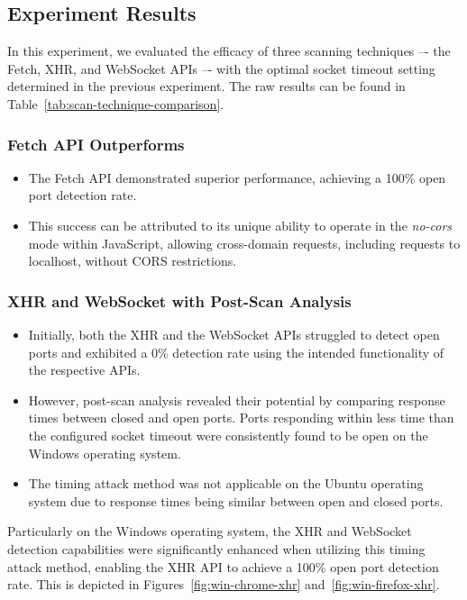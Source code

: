 \subsection{Experiment Results}

In this experiment, we evaluated the efficacy of three scanning techniques –- the Fetch, XHR, and WebSocket APIs –- with the optimal socket timeout setting determined in the previous experiment. The raw results can be found in Table~\ref{tab:scan-technique-comparison}.

\subsubsection{Fetch API Outperforms}

\begin{itemize}
    \item The Fetch API demonstrated superior performance, achieving a 100\% open port detection rate.
    \item This success can be attributed to its unique ability to operate in the \emph{no-cors} mode within JavaScript, allowing cross-domain requests, including requests to localhost, without CORS restrictions.
\end{itemize}

\subsubsection{XHR and WebSocket with Post-Scan Analysis}

\begin{itemize}
    \item Initially, both the XHR and the WebSocket APIs struggled to detect open ports and exhibited a 0\% detection rate using the intended functionality of the respective APIs.
    \item However, post-scan analysis revealed their potential by comparing response times between closed and open ports. Ports responding within less time than the configured socket timeout were consistently found to be open on the Windows operating system.
    \item The timing attack method was not applicable on the Ubuntu operating system due to response times being similar between open and closed ports.
\end{itemize}

Particularly on the Windows operating system, the XHR and WebSocket  detection capabilities were significantly enhanced when utilizing this timing attack method, enabling the XHR API to achieve a 100\% open port detection rate. This is depicted in Figures~\ref{fig:win-chrome-xhr} and~\ref{fig:win-firefox-xhr}.

